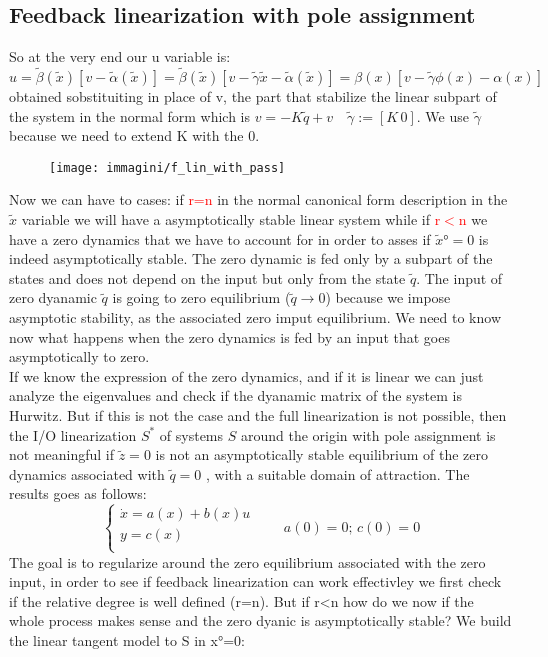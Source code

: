 \subsection{Feedback linearization with pole assignment}
So at the very end our u variable is:\[
	u=\tilde{\beta}(\tilde{x})[v-\tilde{\alpha}(\tilde{x})]=\tilde{\beta}(\tilde{x})[v-\tilde{\gamma}\tilde{x}-\tilde{\alpha}(\tilde{x})]=\beta(x)[v-\tilde{\gamma}\phi(x)-\alpha(x)]
\] obtained sobstituiting in place of v, the part that stabilize the linear subpart of the system in the normal form which is $v=-K\tilde{q}+v \quad \tilde{\gamma}:=[K \, 0]$. We use $\tilde{\gamma}$ because we need to extend K with the 0.
\begin{figure}[H]
	\centering
	\texttt{[image: immagini/f\_lin\_with\_pass]}
	\caption{}
	\label{fig:flinwithpass}
\end{figure}
Now we can have to cases: if \textcolor{red}{r=n} in the normal canonical form description in the $\tilde{x}$	variable we will have a asymptotically stable linear system	while if \textcolor{red}{r$<$n} we have a zero dynamics that we have to account for in order to asses if $\tilde{x}°=0$ is indeed asymptotically stable.
The zero dynamic is fed only by a subpart of the states and does not depend on the input but only from the state $\tilde{q}$. The input of zero dyanamic $\tilde{q}$ is going to zero equilibrium ($\tilde{q}\to0$) because we impose asymptotic stability, as the associated zero imput equilibrium. We need to know now what happens when the zero dynamics is fed by an input that goes asymptotically to zero.\\
If we know the expression of the zero dynamics, and if it is linear we can just analyze the eigenvalues and check if the dyanamic matrix of the system is Hurwitz. But if this is not the case and the full linearization is not possible, then
the I/O linearization $S^*$ of systems $S$ around the origin with pole assignment is not meaningful if $\tilde{z}=0$ is not an asymptotically stable equilibrium of the zero dynamics associated with $\tilde{q}=0$  , with a suitable domain of attraction. The results goes as follows:
\begin{equation*}
	\left\{
	\begin{array}{ll}	
		\dot{x}=a(x)+b(x)u\\
		y=c(x)\\
	\end{array}
	\right. \qquad a(0)=0;\, c(0)=0
\end{equation*}
The goal is to regularize around the zero equilibrium associated with the zero input, in order to see if feedback linearization can work effectivley we first check if the relative degree is well defined (r=n). But if r<n how do we now if the whole process makes sense and the zero dyanic is asymptotically stable? We build the linear tangent model to S in x°=0:
